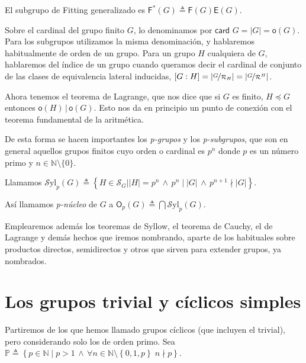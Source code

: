 \documentclass[12pt,a4paper,fleqn,spanish,final,openright]{extbook}
\theoremstyle{definition}
\theoremstyle{remark}
\begin{document}
El subgrupo de Fitting generalizado es
$\mathsf{F}^{*}(G) \triangleq \mathsf{F}(G) \mathsf{E}(G)$.

Sobre el cardinal del grupo finito $G$, lo denominamos por
$\textsf{card }G = \left| G \right| = \mathsf{o}(G)$.
Para los subgrupos utilizamos la misma denominación, y hablaremos
habitualmente de orden de un grupo. Para un grupo $H$ cualquiera
de $G$, hablaremos del índice de un grupo cuando queramos decir
el cardinal de conjunto de las clases de equivalencia lateral inducidas,
$\left[ G : H \right] = \left| \nicefrac{G}{\mathcal{R}_H} \right| =
\left| \nicefrac{G}{\mathcal{R}^H} \right| $.

Ahora tenemos el teorema de Lagrange, que nos dice que si $G$ es finito,
$H      \preccurlyeq       G$ entonces ${\mathsf{o}(H)} \,\vert\, {{\mathsf{o}}(G)}$.
Esto nos da en principio un punto de conexión con el teorema fundamental de la aritmética.

De esta forma se hacen importantes los \emph{p-grupos} y los
\emph{p-subgrupos}, que son en general aquellos grupos finitos cuyo
orden o cardinal es $p^n$ donde $p$ es un número primo y
$n    \in \mathds{N}\setminus\lbrace 0\rbrace$.

Llamamos ${\mathcal{S}\text{yl}}_{p}(G) \triangleq \left\lbrace H    \in \mathcal{S}_{G}
\vert \left| H \right|=p^n \,    \wedge    \, p^{n}∣\left| G \right| \,    \wedge    \, p^{n+1}
\nmid \left| G \right| \right\rbrace$.

Así llamamos \emph{p-núcleo} de $G$ a
$\mathsf{O}_{p}(G) \triangleq \bigcap {\mathcal{S}\text{yl}}_{p}(G)$.

Emplearemos además los teoremas de Syllow, el teorema de Cauchy, el de Lagrange y
demás hechos que iremos nombrando, aparte de los habituales sobre productos directos,
semidirectos y otros que sirven para extender grupos, ya nombrados.

\chapter{Los grupos trivial y cíclicos simples}

Partiremos de los que hemos llamado grupos cíclicos (que incluyen el trivial),
pero considerando solo los de orden primo. Sea
$\mathds{P} \triangleq {\left\lbrace{{p       \in \mathds{N}}∣{p>1\,
   \wedge
\,\forall n
   \in \mathds{N}\setminus{\left\lbrace{0,1,p}\right\rbrace}\; n\nmid p}}\right\rbrace}$.
\end{document}
